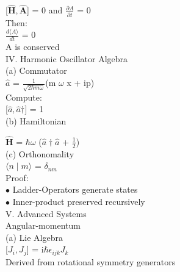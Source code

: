 \documentclass[10pt,fancy]{elegantbook}
\begin{document}
{    [$\mathbf {\hat H}, \mathbf {\hat A}$] = 0 and $\frac{\partial A}{\partial t}$ = 0 \\
 
    Then: \\
 
        $\frac{d \langle A \rangle}{dt}$ = 0 \\
 
        A is conserved  \\

IV. Harmonic Oscillator Algebra \\ 

(a) Commutator  \\
  
$\hat a$ = $\frac{1}{\sqrt{2 \hbar {m} \omega}}$(m $\omega$ x + ip)  \\  

Compute: \\
 
    [$\hat a, \hat a{\dagger}]$ = 1 \\ 
    
(b) Hamiltonian 

$\mathbf{\hat H}$ = $\hbar \omega$ ($\hat a{\dagger} \hat a$ + $\frac{1}{2}$)  \\

(c) Orthonomality  \\  

$\langle n \mid m \rangle$ = $\delta_{nm}$ \\ 

Proof:  \\
  
    $\bullet$ Ladder-Operators generate states  \\
  
    $\bullet$ Inner-product preserved recursively  \\

V. Advanced Systems \\ 

Angular-momentum  \\ 

(a) Lie Algebra \\ 

[$J_i,J_j$] = i$\hbar \epsilon_{ijk} J_k$  \\
  
Derived from rotational symmetry generators \\ 

}
\end{document}
